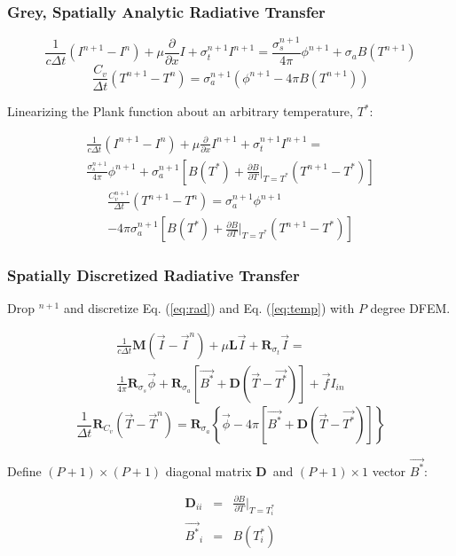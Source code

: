 \documentclass{beamer}
\newcommand{\be}{\begin{equation*}}   %
\newcommand{\ee}{\end{equation*}}
\newcommand{\benum}{\begin{equation}}   %
\newcommand{\eenum}{\end{equation}}
\newcommand{\bea}{\begin{eqnarray*}}  %
\newcommand{\eea}{\end{eqnarray*}}
\newcommand{\eqt}[1]{Eq. (\ref{#1})}  %
\newcommand{\p}{\ensuremath{ \partial}}			%
\newcommand{\M}{\ensuremath{ \mathbf{M} }}
\newcommand{\R}{\ensuremath{ \mathbf{R} }}
\newcommand{\Lm}{\ensuremath{ \mathbf{L} }}
\newcommand{\D}{\ensuremath{ \mathbf{D} }}
\begin{document}
\begin{frame}
\frametitle{Grey, Spatially Analytic Radiative Transfer}
\begin{footnotesize}
\be
\frac{1}{c \Delta t}\left(I^{n+1} - I^n \right) + \mu \frac{\p }{\p x}I + \sigma_{t}^{n+1} I^{n+1} = \frac{\sigma_{s}^{n+1} }{4\pi}\phi^{n+1} + \sigma_{a} B(T^{n+1}) 
\ee
\be
\frac{C_v}{\Delta t}\left(T^{n+1} - T^n \right) = \sigma_a^{n+1} \left(\phi^{n+1}  - 4\pi B(T^{n+1})\right) 
\ee
\end{footnotesize}
\begin{small}
Linearizing the Plank function about an arbitrary temperature, $T^*$:
\end{small}
\begin{footnotesize}
\begin{multline}
\label{eq:rad}
\frac{1}{c \Delta t}\left(I^{n+1} - I^n \right) + \mu \frac{\p }{\p x}I^{n+1} + \sigma_{t}^{n+1} I^{n+1} = \\ \frac{\sigma_{s}^{n+1} }{4\pi}\phi^{n+1} + \sigma_{a}^{n+1} \left[ B(T^*) + \frac{\p B}{\p T} \bigg \lvert_{T=T^*} (T^{n+1} - T^*) \right]
\end{multline}
\begin{multline}
\label{eq:temp}
\frac{C_v^{n+1}}{\Delta t}\left(T^{n+1} - T^n \right) = \sigma_a^{n+1} \phi^{n+1}  \\ - 4\pi \sigma_a^{n+1} \left[ B(T^*) + \frac{\p B}{\p T} \bigg \lvert_{T=T^*} (T^{n+1} - T^*) \right]
\end{multline}
\end{footnotesize}
\end{frame}

\begin{frame}
\frametitle{Spatially Discretized Radiative Transfer}
\begin{small}
Drop $^{n+1}$ and discretize \eqt{eq:rad} and \eqt{eq:temp} with $P$ degree DFEM.
\end{small}
\begin{multline}
\label{eq:rad_disc}
\frac{1}{c \Delta t}\M\left(\vec{I} - \vec{I}^n \right) + \mu \Lm \vec{I} + \R_{\sigma_t} \vec{I} = \\ 
\frac{1}{4\pi}\R_{\sigma_s} \vec{\phi} + \R_{\sigma_a} \left[ \vec{B^*} + \D (\vec{T} - \vec{T^*}) \right] + \vec{f} I_{in}
\end{multline}
\benum
\label{eq:temp_disc}
\frac{1}{\Delta t}\R_{C_v} \left(\vec{T} - \vec{T}^n \right) = \R_{\sigma_a} \left\{ \vec{ \phi}  - 4\pi \left[ \vec{B^*} + \D (\vec{T} - \vec{T^*}) \right] \right \}
\eenum
\begin{small}
Define $(P+1) \times (P+1)$ diagonal matrix \D ~and $(P+1) \times 1$ vector $\vec{B^*}$:
\end{small}
\bea
\D_{ii} &=& \frac{\p B}{\p T }\bigg \lvert_{T = T^*_i}\\
\vec{B^*}_i &=& B(T^*_i)
\eea 
\end{frame}
\end{document}
